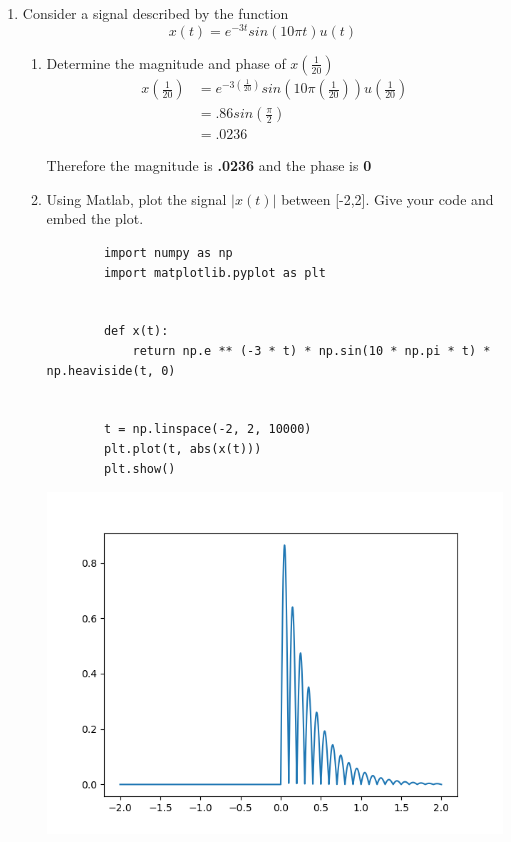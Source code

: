 \documentclass{article}
\begin{document}
\begin{enumerate}
    \item Consider a signal described by the function
    \begin{equation}
        x(t) = e^{-3t}sin(10\pi t) u(t)
    \end{equation}
    \begin{enumerate}
        \item Determine the magnitude and phase of $x(\frac{1}{20})$
        \begin{align}
        x(\frac{1}{20}) & = e^{-3(\frac{1}{20})}sin(10\pi (\frac{1}{20})) u(\frac{1}{20}) \\
         & = .86sin(\frac{\pi}{2})\\
         & = .0236
        \end{align}
        \begin{center}
            Therefore the magnitude is \textbf{.0236} and the phase is \textbf{0}
        \end{center}
        \item Using Matlab, plot the signal $\lvert x(t) \lvert$ between [-2,2]. Give your code and embed the plot.
        \lstset{language=Python}
        \lstset{frame=lines}
        \lstset{basicstyle=\footnotesize}
        \begin{lstlisting}
        import numpy as np
        import matplotlib.pyplot as plt
        
        
        def x(t):
            return np.e ** (-3 * t) * np.sin(10 * np.pi * t) * np.heaviside(t, 0)
        
        
        t = np.linspace(-2, 2, 10000)
        plt.plot(t, abs(x(t)))
        plt.show()
        \end{lstlisting}
        \begin{center}
        \includegraphics[width = .7\textwidth]{1b.png}    
        \end{center}
        

\end{enumerate}
\end{enumerate}
\end{document}

